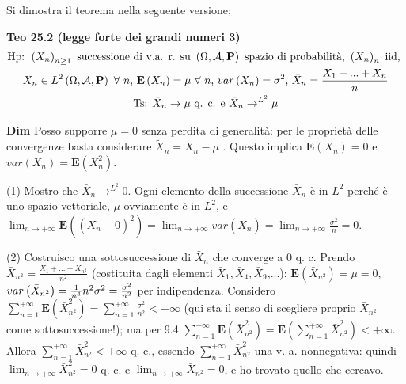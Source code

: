 \documentclass{article}
\begin{document}
Si dimostra il teorema nella seguente versione:

\textbf{Teo 25.2 (legge forte dei grandi numeri 3)}%
\begin{gather*}
\text{Hp: }\left( X_{n}\right) _{n\geq 1}\text{ successione di v.a. r. su }%
\left( \Omega ,\mathcal{A},\mathbf{P}\right) \text{ spazio di probabilit\`{a}%
, }\left( X_{n}\right) _{n}\text{ iid, } \\
X_{n}\in L^{2}\left( \Omega ,\mathcal{A},\mathbf{P}\right) \text{ }\forall 
\text{ }n\text{, }\mathbf{E}\left( X_{n}\right) =\mu \text{ }\forall \text{ }%
n\text{, }var\left( X_{n}\right) =\sigma ^{2}\text{, }\bar{X}_{n}=\frac{%
X_{1}+...+X_{n}}{n} \\
\text{Ts: }\bar{X}_{n}\rightarrow \mu \text{ q. c. e }\bar{X}_{n}\rightarrow
^{L^{2}}\mu
\end{gather*}

\textbf{Dim} Posso supporre $\mu =0$ senza perdita di generalit\`{a}: per le
propriet\`{a} delle convergenze basta considerare $\tilde{X}_{n}=X_{n}-\mu $%
. Questo implica $\mathbf{E}\left( X_{n}\right) =0$ e $var\left(
X_{n}\right) =\mathbf{E}\left( X_{n}^{2}\right) $.

(1) Mostro che $\bar{X}_{n}\rightarrow ^{L^{2}}0$. Ogni elemento della
successione $\bar{X}_{n}$ \`{e} in $L^{2}$ perch\'{e} \`{e} uno spazio
vettoriale, $\mu $ ovviamente \`{e} in $L^{2}$, e $\lim_{n\rightarrow
+\infty }\mathbf{E}\left( \left( \bar{X}_{n}-0\right) ^{2}\right)
=\lim_{n\rightarrow +\infty }var\left( \bar{X}_{n}\right)
=\lim_{n\rightarrow +\infty }\frac{\sigma ^{2}}{n}=0$.

(2) Costruisco una sottosuccessione di $\bar{X}_{n}$ che converge a $0$ q.
c. Prendo $\bar{X}_{n^{2}}=\frac{X_{1}+...+X_{n^{2}}}{n^{2}}$ (costituita
dagli elementi $\bar{X}_{1},\bar{X}_{4},\bar{X}_{9}$,...): $\mathbf{E}\left( 
\bar{X}_{n^{2}}\right) =\mu =0$, $var\left( \bar{X}_{n^{2}}\right) =\frac{1}{%
n^{4}}n^{2}\sigma ^{2}=\frac{\sigma ^{2}}{n^{2}}$ per indipendenza.
Considero $\sum_{n=1}^{+\infty }\mathbf{E}\left( \bar{X}_{n^{2}}^{2}\right)
=\sum_{n=1}^{+\infty }\frac{\sigma ^{2}}{n^{2}}<+\infty $ (qui sta il senso
di scegliere proprio $\bar{X}_{n^{2}}$ come sottosuccessione!); ma per 9.4 $%
\sum_{n=1}^{+\infty }\mathbf{E}\left( \bar{X}_{n^{2}}^{2}\right) =\mathbf{E}%
\left( \sum_{n=1}^{+\infty }\bar{X}_{n^{2}}^{2}\right) <+\infty $. Allora $%
\sum_{n=1}^{+\infty }\bar{X}_{n^{2}}^{2}<+\infty $ q. c., essendo $%
\sum_{n=1}^{+\infty }\bar{X}_{n^{2}}^{2}$ una v. a. nonnegativa: quindi $%
\lim_{n\rightarrow +\infty }\bar{X}_{n^{2}}^{2}=0$ q. c. e $%
\lim_{n\rightarrow +\infty }\bar{X}_{n^{2}}=0$, e ho trovato quello che
cercavo.
\end{document}
